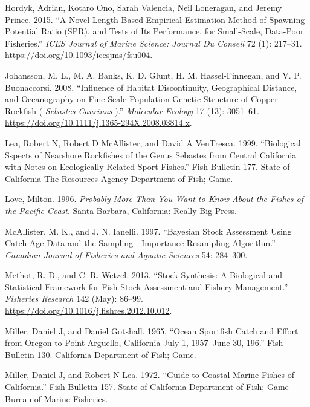 \documentclass[11pt,
  english,
  a4paper,
]{article}
\begin{document}
\begin{cslreferences}
\leavevmode\hypertarget{ref-hordyk_novel_2015}{}%
Hordyk, Adrian, Kotaro Ono, Sarah Valencia, Neil Loneragan, and Jeremy Prince. 2015. ``A Novel Length-Based Empirical Estimation Method of Spawning Potential Ratio (SPR), and Tests of Its Performance, for Small-Scale, Data-Poor Fisheries.'' \emph{ICES Journal of Marine Science: Journal Du Conseil} 72 (1): 217--31. \url{https://doi.org/10.1093/icesjms/fsu004}.

\leavevmode\hypertarget{ref-johansson_influence_2008}{}%
Johansson, M. L., M. A. Banks, K. D. Glunt, H. M. Hassel-Finnegan, and V. P. Buonaccorsi. 2008. ``Influence of Habitat Discontinuity, Geographical Distance, and Oceanography on Fine-Scale Population Genetic Structure of Copper Rockfish ( \emph{Sebastes Caurinus} ).'' \emph{Molecular Ecology} 17 (13): 3051--61. \url{https://doi.org/10.1111/j.1365-294X.2008.03814.x}.

\leavevmode\hypertarget{ref-lea_biological_1999}{}%
Lea, Robert N, Robert D McAllister, and David A VenTresca. 1999. ``Biological Sspects of Nearshore Rockfishes of the Genus Sebastes from Central California with Notes on Ecologically Related Sport Fishes.'' Fish Bulletin 177. State of California The Resources Agency Department of Fish; Game.

\leavevmode\hypertarget{ref-love_milton_probably_1996}{}%
Love, Milton. 1996. \emph{Probably More Than You Want to Know About the Fishes of the Pacific Coast}. Santa Barbara, California: Really Big Press.

\leavevmode\hypertarget{ref-mcallister_bayesian_1997}{}%
McAllister, M. K., and J. N. Ianelli. 1997. ``Bayesian Stock Assessment Using Catch-Age Data and the Sampling - Importance Resampling Algorithm.'' \emph{Canadian Journal of Fisheries and Aquatic Sciences} 54: 284--300.

\leavevmode\hypertarget{ref-methot_stock_2013}{}%
Methot, R. D., and C. R. Wetzel. 2013. ``Stock Synthesis: A Biological and Statistical Framework for Fish Stock Assessment and Fishery Management.'' \emph{Fisheries Research} 142 (May): 86--99. \url{https://doi.org/10.1016/j.fishres.2012.10.012}.

\leavevmode\hypertarget{ref-miller_ocean_1965}{}%
Miller, Daniel J, and Daniel Gotshall. 1965. ``Ocean Sportfish Catch and Effort from Oregon to Point Arguello, California July 1, 1957--June 30, 196.'' Fish Bulletin 130. California Department of Fish; Game.

\leavevmode\hypertarget{ref-miller_guide_1972}{}%
Miller, Daniel J, and Robert N Lea. 1972. ``Guide to Coastal Marine Fishes of California.'' Fish Bulletin 157. State of California Department of Fish; Game Bureau of Marine Fisheries.


\end{cslreferences}
\end{document}

